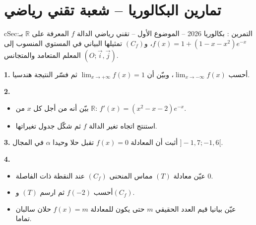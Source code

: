\documentclass[12pt,a4paper]{article}
\newenvironment{BOX}[2]{\begin{otherlanguage}{english}\begin{arbox}{#1}{#2}}{\end{arbox}\end{otherlanguage}}
\newcounter{exo}
\newenvironment{tamrin}[1]{\stepcounter{exo}\begin{BOX}{cSec}{التمرين \theexo: #1}}{\end{BOX}}
\newenvironment{LTR}{\begin{otherlanguage}{english}}{\end{otherlanguage}}
\newcommand{\R}{\mathbb{R}}
\newenvironment{sq}{\begin{itemize}[leftmargin=2.4em,itemsep=3pt]}{\end{itemize}}
\newcommand{\qa}{\item[(أ)]}\newcommand{\qb}{\item[(ب)]}\newcommand{\qc}{\item[(جـ)]}\newcommand{\qd}{\item[(د)]}\newcommand{\qe}{\item[(هـ)]}
\newcommand{\QQ}[1]{\par\smallskip\textbf{#1.} }
\begin{document}
\section{تمارين البكالوريا -- شعبة تقني رياضي}
\newenvironment{GRbt}[6]{\par\begin{center}\begin{LTR}\begin{tikzpicture}[x=#5cm,y=#6cm,font=\footnotesize]
 \draw[gray!25,very thin] (#1,#3) grid (#2,#4);
 \draw[-{Stealth[length=2mm]}] (#1,0)--(#2+0.3,0) node[below left]{$x$};
 \draw[-{Stealth[length=2mm]}] (0,#3)--(0,#4+0.3) node[below left]{$y$};
 \node[below left] at (0,0){$O$};
 \begin{scope}\clip (#1,#3) rectangle (#2,#4);}
{\end{scope}\end{tikzpicture}\end{LTR}\end{center}}

\begin{tamrin}{بكالوريا 2026 -- الموضوع الأول -- تقني رياضي}
الدالة $f$ المعرفة على $\R$ بـ: $f(x)=1+\left(1-x-x^2\right)e^{-x}$، و$(C_f)$ تمثيلها البياني في المستوي المنسوب إلى المعلم المتعامد والمتجانس $(O;\vec{i},\vec{j})$.
\QQ{1} أحسب $\displaystyle\lim_{x\to-\infty}f(x)$، وبيّن أن $\displaystyle\lim_{x\to+\infty}f(x)=1$ ثم فسّر النتيجة هندسيا.
\QQ{2}
\begin{sq}
\qa بيّن أنه من أجل كل $x$ من $\R$: $f'(x)=\left(x^2-x-2\right)e^{-x}$.
\qb استنتج اتجاه تغير الدالة $f$ ثم شكّل جدول تغيراتها.
\end{sq}
\QQ{3} أثبت أن المعادلة $f(x)=0$ تقبل حلا وحيدا $\alpha$ في المجال $]-1{,}7;-1{,}6[$.
\QQ{4}
\begin{sq}
\qa عيّن معادلة $(T)$ مماس المنحنى $(C_f)$ عند النقطة ذات الفاصلة $0$.
\qb أحسب $f(-2)$ ثم ارسم $(T)$ و$(C_f)$.
\qc عيّن بيانيا قيم العدد الحقيقي $m$ حتى يكون للمعادلة $f(x)=m$ حلان سالبان تماما.
\end{sq}
\end{tamrin}
\end{document}
